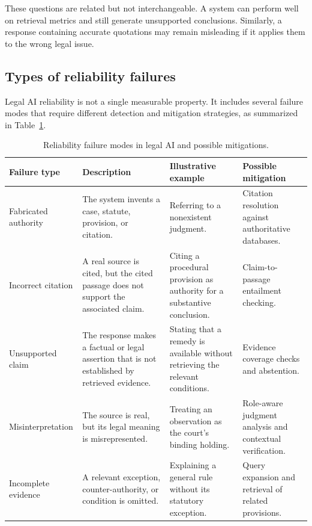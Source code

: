 These questions are related but not interchangeable. A system can perform well on retrieval metrics and
still generate unsupported conclusions. Similarly, a response containing accurate quotations may remain
misleading if it applies them to the wrong legal issue.

\subsection{Types of reliability failures}

Legal AI reliability is not a single measurable property. It includes several failure modes that
require different detection and mitigation strategies, as summarized in Table~\ref{tab:failures}.

\begin{table}[tp]
\centering
\caption{Reliability failure modes in legal AI and possible mitigations.}
\label{tab:failures}
\footnotesize
\setlength{\tabcolsep}{5pt}
\renewcommand{\arraystretch}{1.3}
\begin{tabularx}{\textwidth}{>{\raggedright\arraybackslash}p{2.5cm} >{\raggedright\arraybackslash}X >{\raggedright\arraybackslash}X >{\raggedright\arraybackslash}X}
\toprule
\textbf{Failure type} & \textbf{Description} & \textbf{Illustrative example} & \textbf{Possible mitigation} \\
\midrule
Fabricated authority & The system invents a case, statute, provision, or citation. & Referring to a nonexistent judgment. & Citation resolution against authoritative databases. \\
Incorrect citation & A real source is cited, but the cited passage does not support the associated claim. & Citing a procedural provision as authority for a substantive conclusion. & Claim-to-passage entailment checking. \\
Unsupported claim & The response makes a factual or legal assertion that is not established by retrieved evidence. & Stating that a remedy is available without retrieving the relevant conditions. & Evidence coverage checks and abstention. \\
Misinterpretation & The source is real, but its legal meaning is misrepresented. & Treating an observation as the court's binding holding. & Role-aware judgment analysis and contextual verification. \\
Incomplete evidence & A relevant exception, counter-authority, or condition is omitted. & Explaining a general rule without its statutory exception. & Query expansion and retrieval of related provisions. \\

\end{tabularx}
\end{table}
